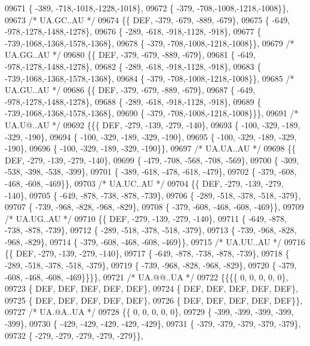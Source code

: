 \begin{DoxyCode}
09671 \{ -389, -718,-1018,-1228,-1018\},
09672 \{ -379, -708,-1008,-1218,-1008\}\},
09673 \textcolor{comment}{/* UA.GC..AU */}
09674 \{\{  DEF, -379, -679, -889, -679\},
09675 \{ -649, -978,-1278,-1488,-1278\},
09676 \{ -289, -618, -918,-1128, -918\},
09677 \{ -739,-1068,-1368,-1578,-1368\},
09678 \{ -379, -708,-1008,-1218,-1008\}\},
09679 \textcolor{comment}{/* UA.GG..AU */}
09680 \{\{  DEF, -379, -679, -889, -679\},
09681 \{ -649, -978,-1278,-1488,-1278\},
09682 \{ -289, -618, -918,-1128, -918\},
09683 \{ -739,-1068,-1368,-1578,-1368\},
09684 \{ -379, -708,-1008,-1218,-1008\}\},
09685 \textcolor{comment}{/* UA.GU..AU */}
09686 \{\{  DEF, -379, -679, -889, -679\},
09687 \{ -649, -978,-1278,-1488,-1278\},
09688 \{ -289, -618, -918,-1128, -918\},
09689 \{ -739,-1068,-1368,-1578,-1368\},
09690 \{ -379, -708,-1008,-1218,-1008\}\}\},
09691 \textcolor{comment}{/* UA.U@..AU */}
09692 \{\{\{  DEF, -279, -139, -279, -140\},
09693 \{ -100, -329, -189, -329, -190\},
09694 \{ -100, -329, -189, -329, -190\},
09695 \{ -100, -329, -189, -329, -190\},
09696 \{ -100, -329, -189, -329, -190\}\},
09697 \textcolor{comment}{/* UA.UA..AU */}
09698 \{\{  DEF, -279, -139, -279, -140\},
09699 \{ -479, -708, -568, -708, -569\},
09700 \{ -309, -538, -398, -538, -399\},
09701 \{ -389, -618, -478, -618, -479\},
09702 \{ -379, -608, -468, -608, -469\}\},
09703 \textcolor{comment}{/* UA.UC..AU */}
09704 \{\{  DEF, -279, -139, -279, -140\},
09705 \{ -649, -878, -738, -878, -739\},
09706 \{ -289, -518, -378, -518, -379\},
09707 \{ -739, -968, -828, -968, -829\},
09708 \{ -379, -608, -468, -608, -469\}\},
09709 \textcolor{comment}{/* UA.UG..AU */}
09710 \{\{  DEF, -279, -139, -279, -140\},
09711 \{ -649, -878, -738, -878, -739\},
09712 \{ -289, -518, -378, -518, -379\},
09713 \{ -739, -968, -828, -968, -829\},
09714 \{ -379, -608, -468, -608, -469\}\},
09715 \textcolor{comment}{/* UA.UU..AU */}
09716 \{\{  DEF, -279, -139, -279, -140\},
09717 \{ -649, -878, -738, -878, -739\},
09718 \{ -289, -518, -378, -518, -379\},
09719 \{ -739, -968, -828, -968, -829\},
09720 \{ -379, -608, -468, -608, -469\}\}\}\},
09721 \textcolor{comment}{/* UA.@@..UA */}
09722 \{\{\{\{    0,    0,    0,    0,    0\},
09723 \{  DEF,  DEF,  DEF,  DEF,  DEF\},
09724 \{  DEF,  DEF,  DEF,  DEF,  DEF\},
09725 \{  DEF,  DEF,  DEF,  DEF,  DEF\},
09726 \{  DEF,  DEF,  DEF,  DEF,  DEF\}\},
09727 \textcolor{comment}{/* UA.@A..UA */}
09728 \{\{    0,    0,    0,    0,    0\},
09729 \{ -399, -399, -399, -399, -399\},
09730 \{ -429, -429, -429, -429, -429\},
09731 \{ -379, -379, -379, -379, -379\},
09732 \{ -279, -279, -279, -279, -279\}\},

\end{DoxyCode}
